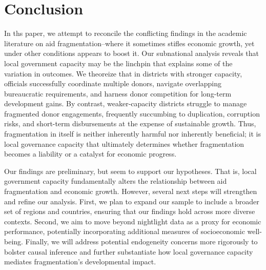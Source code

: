 \documentclass[11pt]{article}
\begin{document}
\section{Conclusion}
In ths paper, we attempt to reconcile the conflicting findings in the academic literature on aid fragmentation--where it sometimes stifles economic growth, yet under other conditions appears to boost it. Our subnational analysis reveals that local government capacity may be the linchpin that explains some of the variation in outcomes. We theoreize that in districts with stronger capacity, officials successfully coordinate multiple donors, navigate overlapping bureaucratic requirements, and harness donor competition for long-term development gains. By contrast, weaker-capacity districts struggle to manage fragmented donor engagements, frequently succumbing to duplication, corruption risks, and short-term disbursements at the expense of sustainable growth. Thus, fragmentation in itself is neither inherently harmful nor inherently beneficial; it is local governance capacity that ultimately determines whether fragmentation becomes a liability or a catalyst for economic progress.

Our findings are preliminary, but seem to support our hypotheses. That is, local government capacity fundamentally alters the relationship between aid fragmentation and economic growth. However, several next steps will strengthen and refine our analysis. First, we plan to expand our sample to include a broader set of regions and countries, ensuring that our findings hold across more diverse contexts. Second, we aim to move beyond nightlight data as a proxy for economic performance, potentially incorporating additional measures of socioeconomic well-being. Finally, we will address potential endogeneity concerns more rigorously to bolster causal inference and further substantiate how local governance capacity mediates fragmentation’s developmental impact.

\medskip

 

\newpage






\end{document}

